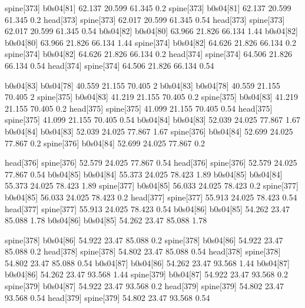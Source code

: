 spine[373]    b0s04[81]    62.137    20.599    61.345    0.2
spine[373]    b0s04[81]    62.137    20.599    61.345    0.2
head[373]    spine[373]    62.017    20.599    61.345    0.54
head[373]    spine[373]    62.017    20.599    61.345    0.54
b0s04[82]    b0s04[80]    63.966    21.826    66.134    1.44
b0s04[82]    b0s04[80]    63.966    21.826    66.134    1.44
spine[374]    b0s04[82]    64.626    21.826    66.134    0.2
spine[374]    b0s04[82]    64.626    21.826    66.134    0.2
head[374]    spine[374]    64.506    21.826    66.134    0.54
head[374]    spine[374]    64.506    21.826    66.134    0.54


b0s04[83]    b0s04[78]    40.559    21.155    70.405    2
b0s04[83]    b0s04[78]    40.559    21.155    70.405    2
spine[375]    b0s04[83]    41.219    21.155    70.405    0.2
spine[375]    b0s04[83]    41.219    21.155    70.405    0.2
head[375]    spine[375]    41.099    21.155    70.405    0.54
head[375]    spine[375]    41.099    21.155    70.405    0.54
b0s04[84]    b0s04[83]    52.039    24.025    77.867    1.67
b0s04[84]    b0s04[83]    52.039    24.025    77.867    1.67
spine[376]    b0s04[84]    52.699    24.025    77.867    0.2
spine[376]    b0s04[84]    52.699    24.025    77.867    0.2


head[376]    spine[376]    52.579    24.025    77.867    0.54
head[376]    spine[376]    52.579    24.025    77.867    0.54
b0s04[85]    b0s04[84]    55.373    24.025    78.423    1.89
b0s04[85]    b0s04[84]    55.373    24.025    78.423    1.89
spine[377]    b0s04[85]    56.033    24.025    78.423    0.2
spine[377]    b0s04[85]    56.033    24.025    78.423    0.2
head[377]    spine[377]    55.913    24.025    78.423    0.54
head[377]    spine[377]    55.913    24.025    78.423    0.54
b0s04[86]    b0s04[85]    54.262    23.47    85.088    1.78
b0s04[86]    b0s04[85]    54.262    23.47    85.088    1.78


spine[378]    b0s04[86]    54.922    23.47    85.088    0.2
spine[378]    b0s04[86]    54.922    23.47    85.088    0.2
head[378]    spine[378]    54.802    23.47    85.088    0.54
head[378]    spine[378]    54.802    23.47    85.088    0.54
b0s04[87]    b0s04[86]    54.262    23.47    93.568    1.44
b0s04[87]    b0s04[86]    54.262    23.47    93.568    1.44
spine[379]    b0s04[87]    54.922    23.47    93.568    0.2
spine[379]    b0s04[87]    54.922    23.47    93.568    0.2
head[379]    spine[379]    54.802    23.47    93.568    0.54
head[379]    spine[379]    54.802    23.47    93.568    0.54


